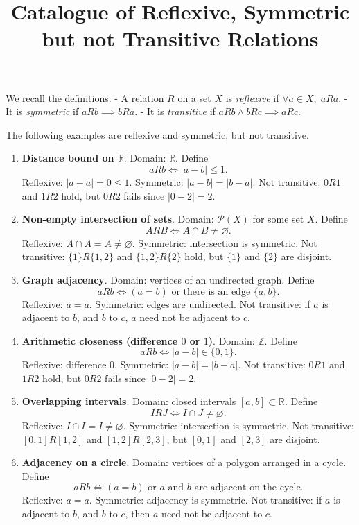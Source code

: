 \documentclass[11pt,a4paper]{article}
\title{Catalogue of Reflexive, Symmetric but not Transitive Relations}
\author{}
\date{}
\begin{document}
	
	\maketitle
	
	
	
	We recall the definitions:  
	- A relation $R$ on a set $X$ is \emph{reflexive} if $\forall a\in X,\; aRa$.  
	- It is \emph{symmetric} if $aRb \implies bRa$.  
	- It is \emph{transitive} if $aRb \wedge bRc \implies aRc$.  
	
	The following examples are reflexive and symmetric, but not transitive.
	
	\begin{enumerate}[label=\textbf{\arabic*.}]
		\item \textbf{Distance bound on $\mathbb{R}$}.  
		Domain: $\mathbb{R}$. Define
		$$
		aRb \iff |a-b|\leq 1.
		$$
		Reflexive: $|a-a|=0\leq 1$.  
		Symmetric: $|a-b|=|b-a|$.  
		Not transitive: $0R1$ and $1R2$ hold, but $0R2$ fails since $|0-2|=2$.  
		
		\item \textbf{Non-empty intersection of sets}.  
		Domain: $\mathcal{P}(X)$ for some set $X$. Define
		$$
		A R B \iff A\cap B \neq \varnothing.
		$$
		Reflexive: $A\cap A=A\neq \varnothing$.  
		Symmetric: intersection is symmetric.  
		Not transitive: $\{1\}R\{1,2\}$ and $\{1,2\}R\{2\}$ hold, but $\{1\}$ and $\{2\}$ are disjoint.  
		
		\item \textbf{Graph adjacency}.  
		Domain: vertices of an undirected graph. Define
		$$
		aRb \iff (a=b) \text{ or there is an edge } \{a,b\}.
		$$
		Reflexive: $a=a$.  
		Symmetric: edges are undirected.  
		Not transitive: if $a$ is adjacent to $b$, and $b$ to $c$, $a$ need not be adjacent to $c$.  
		
		\item \textbf{Arithmetic closeness (difference $0$ or $1$)}.  
		Domain: $\mathbb{Z}$. Define
		$$
		aRb \iff |a-b| \in \{0,1\}.
		$$
		Reflexive: difference $0$.  
		Symmetric: $|a-b|=|b-a|$.  
		Not transitive: $0R1$ and $1R2$ hold, but $0R2$ fails since $|0-2|=2$.  
		
		\item \textbf{Overlapping intervals}.  
		Domain: closed intervals $[a,b]\subset \mathbb{R}$. Define
		$$
		I R J \iff I\cap J \neq \varnothing.
		$$
		Reflexive: $I\cap I=I\neq \varnothing$.  
		Symmetric: intersection is symmetric.  
		Not transitive: $[0,1]R[1,2]$ and $[1,2]R[2,3]$, but $[0,1]$ and $[2,3]$ are disjoint.  
		
		\item \textbf{Adjacency on a circle}.  
		Domain: vertices of a polygon arranged in a cycle. Define
		$$
		aRb \iff (a=b) \text{ or $a$ and $b$ are adjacent on the cycle}.
		$$
		Reflexive: $a=a$.  
		Symmetric: adjacency is symmetric.  
		Not transitive: if $a$ is adjacent to $b$, and $b$ to $c$, then $a$ need not be adjacent to $c$.  
	\end{enumerate}
	
\end{document}
